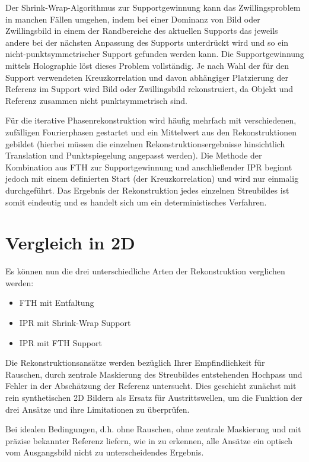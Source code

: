 Der Shrink-Wrap-Algorithmus zur Supportgewinnung kann das Zwillingsproblem in manchen Fällen umgehen, indem bei einer Dominanz von Bild oder Zwillingsbild in einem der Randbereiche des aktuellen Supports das jeweils andere bei der nächsten Anpassung des Supports unterdrückt wird und so ein nicht-punktsymmetrischer Support gefunden werden kann.
Die Supportgewinnung mittels Holographie löst dieses Problem vollständig. Je nach Wahl der für den Support verwendeten Kreuzkorrelation und davon abhängiger Platzierung der Referenz im Support wird Bild oder Zwillingsbild rekonstruiert, da Objekt und Referenz zusammen nicht punktsymmetrisch sind.

Für die iterative Phasenrekonstruktion wird häufig mehrfach mit verschiedenen, zufälligen Fourierphasen gestartet und ein Mittelwert aus den Rekonstruktionen gebildet (hierbei müssen die einzelnen Rekonstruktionsergebnisse hinsichtlich Translation und Punktspiegelung angepasst werden). Die Methode der Kombination aus FTH zur Supportgewinnung und anschließender IPR beginnt jedoch mit einem definierten Start (der Kreuzkorrelation) und wird nur einmalig durchgeführt. Das Ergebnis der Rekonstruktion jedes einzelnen Streubildes ist somit eindeutig und es handelt sich um ein deterministisches Verfahren.

\section{Vergleich in 2D}	
Es können nun die drei unterschiedliche Arten der Rekonstruktion verglichen werden:
\begin{itemize}
	\item FTH mit Entfaltung
	\item IPR mit Shrink-Wrap Support
	\item IPR mit FTH Support
\end{itemize}

Die Rekonstruktionsansätze werden bezüglich Ihrer Empfindlichkeit für Rauschen, durch zentrale Maskierung des Streubildes entstehenden Hochpass und Fehler in der Abschätzung der Referenz untersucht. Dies geschieht zunächst mit rein synthetischen 2D Bildern als Ersatz für Austrittswellen, um die Funktion der drei Ansätze und ihre Limitationen zu überprüfen.

Bei idealen Bedingungen, d.h. ohne Rauschen, ohne zentrale Maskierung und mit präzise bekannter Referenz liefern, wie in  zu erkennen, alle Ansätze ein optisch vom Ausgangsbild nicht zu unterscheidendes Ergebnis.


